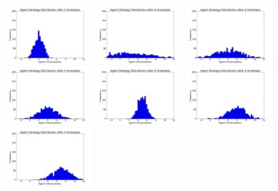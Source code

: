 \documentclass[11pt]{article}
\begin{document}
\begin{figure}
  \centering
  \quad
  \includegraphics[width=0.3\textwidth]{figures/ic1.png}
  \includegraphics[width=0.3\textwidth]{figures/ic2.png}
  \includegraphics[width=0.3\textwidth]{figures/ic3.png}
  \includegraphics[width=0.3\textwidth]{figures/ic4.png}
  \includegraphics[width=0.3\textwidth]{figures/ic5.png}
  \includegraphics[width=0.3\textwidth]{figures/ic6.png}
  \includegraphics[width=0.3\textwidth]{figures/ic7.png}

\end{figure}
\end{document}
